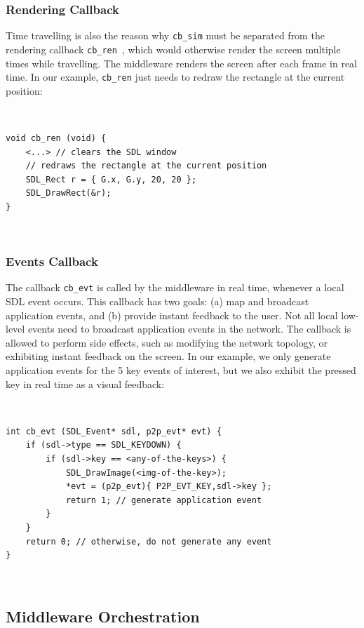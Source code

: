 \documentclass[sn-mathphys,iicol]{sn-jnl}%
\newcommand{\code}[1]  {\texttt{\small{#1}}}
\begin{document}
\subsubsection{Rendering Callback}
\label{sec.tml.api.cb_ren}

Time travelling is also the reason why \code{cb\_sim} must be separated from
the rendering callback \code{cb\_ren}~\cite{tml.js}, which would otherwise
render the screen multiple times while travelling.
The middleware renders the screen after each frame in real time.
In our example, \code{cb\_ren} just needs to redraw the rectangle at the
current position:

{\footnotesize
~
\begin{verbatim}
void cb_ren (void) {
    <...> // clears the SDL window
    // redraws the rectangle at the current position
    SDL_Rect r = { G.x, G.y, 20, 20 };
    SDL_DrawRect(&r);
}
\end{verbatim}
~
}

\subsubsection{Events Callback}
\label{sec.tml.api.cb_evt}

The callback \code{cb\_evt} is called by the middleware in real time, whenever
a local SDL event occurs.
This callback has two goals:
    (a) map and broadcast application events, and
    (b) provide instant feedback to the user.
Not all local low-level events need to broadcast application events in the
network.
The callback is allowed to perform side effects, such as modifying the network
topology, or exhibiting instant feedback on the screen.
In our example, we only generate application events for the 5 key events of
interest, but we also exhibit the pressed key in real time as a visual
feedback:

{\footnotesize
~
\begin{verbatim}
int cb_evt (SDL_Event* sdl, p2p_evt* evt) {
    if (sdl->type == SDL_KEYDOWN) {
        if (sdl->key == <any-of-the-keys>) {
            SDL_DrawImage(<img-of-the-key>);
            *evt = (p2p_evt){ P2P_EVT_KEY,sdl->key };
            return 1; // generate application event
        }
    }
    return 0; // otherwise, do not generate any event
}
\end{verbatim}
~
}

\subsection{Middleware Orchestration}
\label{sec.tml.middleware}
\end{document}
